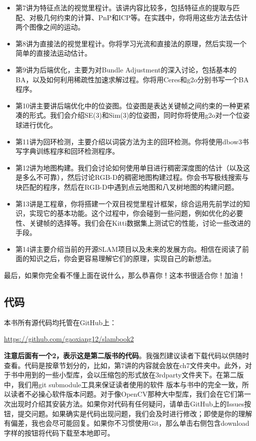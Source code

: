 \begin{enumerate}
\begin{itemize}[leftmargin=1.5em]
	\item 第7讲为特征点法的视觉里程计。该讲内容比较多，包括特征点的提取与匹配、对极几何约束的计算、PnP和ICP等。在实践中，你将用这些方法去估计两个图像之间的运动。
	\item 第8讲为直接法的视觉里程计。你将学习光流和直接法的原理，然后实现一个简单的直接法运动估计。
	\item 第9讲为后端优化，主要为对Bundle Adjustment的深入讨论，包括基本的BA，以及如何利用稀疏性加速求解过程。你将用Ceres和g2o分别书写一个BA程序。
	\item 第10讲主要讲后端优化中的位姿图。位姿图是表达关键帧之间约束的一种更紧凑的形式。我们会介绍SE(3)和Sim(3)的位姿图，同时你将使用g2o对一个位姿球进行优化。
	\item 第11讲为回环检测，主要介绍以词袋方法为主的回环检测。你将使用dbow3书写字典训练程序和回环检测程序。
	\item 第12讲为地图构建。我们会讨论如何使用单目进行稠密深度图的估计（以及这是多么不可靠），然后讨论RGB-D的稠密地图构建过程。你会书写极线搜索与块匹配的程序，然后在RGB-D中遇到点云地图和八叉树地图的构建问题。
	\item 第13讲是工程章，你将搭建一个双目视觉里程计框架，综合运用先前学过的知识，实现它的基本功能。这个过程中，你会碰到一些问题，例如优化的必要性、关键帧的选择等。我们会在Kitti数据集上测试它的性能，讨论一些改进的手段。
	\item 第14讲主要介绍当前的开源SLAM项目以及未来的发展方向。相信在阅读了前面的知识之后，你会更容易理解它们的原理，实现自己的新想法。
\end{itemize}
\end{enumerate}

最后，如果你完全看不懂上面在说什么，那么恭喜你！这本书很适合你！加油！

\subsection{代码}
本书所有源代码均托管在GitHub上：

{\hfill\url{https://github.com/gaoxiang12/slambook2}\hfill}

\textbf{注意后面有一个2，表示这是第二版书的代码}。我强烈建议读者下载代码以供随时查看。代码是按章节划分的，比如，第7讲的内容就会放在ch7文件夹中。此外，对于书中用到的一些小型库，会以压缩包的形式放在3rdparty文件夹下。在第二版中，我们用git submodule工具来保证读者使用的软件 版本与书中的完全一致，所以读者不必操心软件版本问题。对于像OpenCV那种大中型库，我们会在它们第一次出现时介绍其安装方法。如果你对代码有任何疑问，请单击GitHub上的Issues按钮，提交问题。如果确实是代码出现问题，我们会及时进行修改；即使是你的理解有偏差，我也会尽可能回复。如果你不习惯使用Git，那么单击右侧包含download字样的按钮将代码下载至本地即可。%

